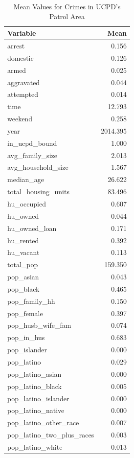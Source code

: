 \documentclass{ucetd}
\begin{document}
\begin{table}

\caption{\label{tab:in-ucpd-means}Mean Values for Crimes in UCPD's Patrol Area}
\centering
\begin{tabular}[t]{lr}
\toprule
Variable & Mean\\
\midrule
arrest & 0.156\\
domestic & 0.126\\
armed & 0.025\\
aggravated & 0.044\\
attempted & 0.014\\
\addlinespace
time & 12.793\\
weekend & 0.258\\
year & 2014.395\\
in\_ucpd\_bound & 1.000\\
avg\_family\_size & 2.013\\
\addlinespace
avg\_household\_size & 1.567\\
median\_age & 26.622\\
total\_housing\_units & 83.496\\
hu\_occupied & 0.607\\
hu\_owned & 0.044\\
\addlinespace
hu\_owned\_loan & 0.171\\
hu\_rented & 0.392\\
hu\_vacant & 0.113\\
total\_pop & 159.350\\
pop\_asian & 0.043\\
\addlinespace
pop\_black & 0.465\\
pop\_family\_hh & 0.150\\
pop\_female & 0.397\\
pop\_husb\_wife\_fam & 0.074\\
pop\_in\_hus & 0.683\\
\addlinespace
pop\_islander & 0.000\\
pop\_latino & 0.029\\
pop\_latino\_asian & 0.000\\
pop\_latino\_black & 0.005\\
pop\_latino\_islander & 0.000\\
\addlinespace
pop\_latino\_native & 0.000\\
pop\_latino\_other\_race & 0.007\\
pop\_latino\_two\_plus\_races & 0.003\\
pop\_latino\_white & 0.013\\

\end{tabular}
\end{table}
\end{document}
